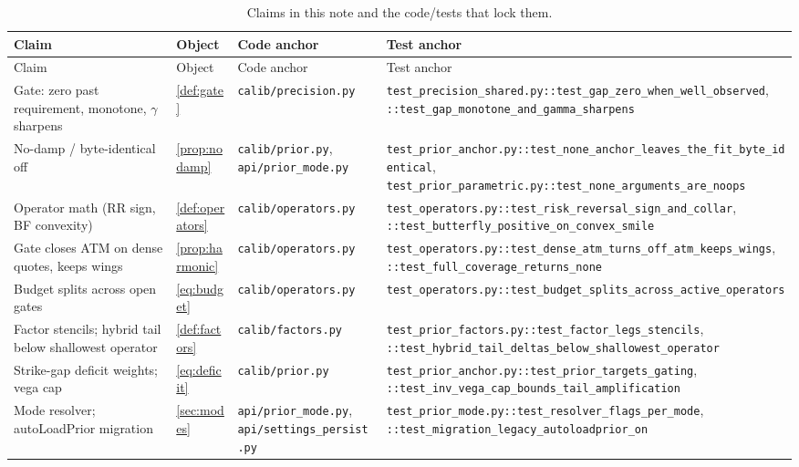 \documentclass[11pt]{article}
\begin{document}
\begingroup
\small
\setlength{\tabcolsep}{3pt}
\begin{longtable}{@{}p{}p{}p{}p{}@{}}
\caption{Claims in this note and the code/tests that lock them.}\\
\toprule Claim & Object & Code anchor & Test anchor\\ \midrule
\endfirsthead
\toprule Claim & Object & Code anchor & Test anchor\\ \midrule
\endhead
Gate: zero past requirement, monotone, $\gamma$ sharpens &
\cref{def:gate} &
\nolinkurl{calib/precision.py} &
\nolinkurl{test_precision_shared.py::test_gap_zero_when_well_observed}, \nolinkurl{::test_gap_monotone_and_gamma_sharpens}\\
No-damp / byte-identical off &
\cref{prop:nodamp} &
\nolinkurl{calib/prior.py}, \nolinkurl{api/prior_mode.py} &
\nolinkurl{test_prior_anchor.py::test_none_anchor_leaves_the_fit_byte_identical}, \nolinkurl{test_prior_parametric.py::test_none_arguments_are_noops}\\
Operator math (RR sign, BF convexity) &
\cref{def:operators} &
\nolinkurl{calib/operators.py} &
\nolinkurl{test_operators.py::test_risk_reversal_sign_and_collar}, \nolinkurl{::test_butterfly_positive_on_convex_smile}\\
Gate closes ATM on dense quotes, keeps wings &
\cref{prop:harmonic} &
\nolinkurl{calib/operators.py} &
\nolinkurl{test_operators.py::test_dense_atm_turns_off_atm_keeps_wings}, \nolinkurl{::test_full_coverage_returns_none}\\
Budget splits across open gates &
\eqref{eq:budget} &
\nolinkurl{calib/operators.py} &
\nolinkurl{test_operators.py::test_budget_splits_across_active_operators}\\
Factor stencils; hybrid tail below shallowest operator &
\cref{def:factors} &
\nolinkurl{calib/factors.py} &
\nolinkurl{test_prior_factors.py::test_factor_legs_stencils}, \nolinkurl{::test_hybrid_tail_deltas_below_shallowest_operator}\\
Strike-gap deficit weights; vega cap &
\eqref{eq:deficit} &
\nolinkurl{calib/prior.py} &
\nolinkurl{test_prior_anchor.py::test_prior_targets_gating}, \nolinkurl{::test_inv_vega_cap_bounds_tail_amplification}\\
Mode resolver; autoLoadPrior migration &
\cref{sec:modes} &
\nolinkurl{api/prior_mode.py}, \nolinkurl{api/settings_persist.py} &
\nolinkurl{test_prior_mode.py::test_resolver_flags_per_mode}, \nolinkurl{::test_migration_legacy_autoloadprior_on}\\

\end{longtable}
\end{document}
